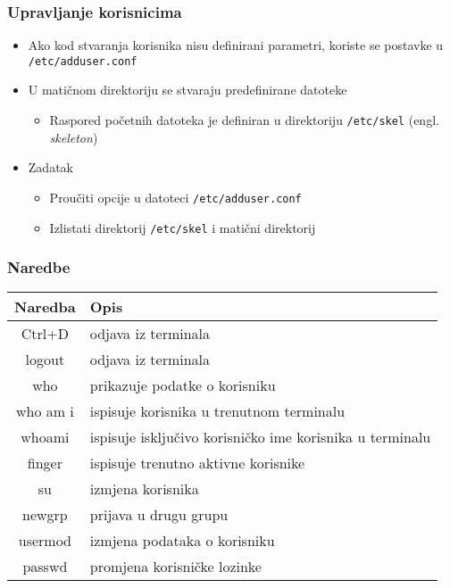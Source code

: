 \documentclass[table,usenames,dvipsnames] {beamer}
\newcommand{\shell}[1]{\texttt{#1}}
\begin{document}
\begin{frame}[t]
\frametitle{Upravljanje korisnicima}
\begin{itemize}
  \item Ako kod stvaranja korisnika nisu definirani parametri, koriste se 
        postavke u \shell{/etc/adduser.conf}
  \item U matičnom direktoriju se stvaraju predefinirane datoteke
  \begin{itemize}
     \item Raspored početnih datoteka je definiran u direktoriju \shell{/etc/skel} (engl. \emph{skeleton})
  \end{itemize}
\end{itemize}
\begin{itemize}
  \item Zadatak
  \begin{itemize}
    \item Proučiti opcije u datoteci \shell{/etc/adduser.conf}
    \item Izlistati direktorij \shell{/etc/skel} i matični direktorij
  \end{itemize}
\end{itemize}
\end{frame}

\begin{frame}[t]
	\frametitle{Naredbe}
	\begin{table}[h]
		\begin{tabular}{|c|l|}
			\hline
			\rowcolor{BlueViolet!20}Naredba & Opis \\
			\hline
			Ctrl+D & odjava iz terminala \\
			\hline
			logout & odjava iz terminala \\
			\hline
			who & prikazuje podatke o korisniku \\
			\hline
			who am i & ispisuje korisnika u trenutnom terminalu \\
			\hline
			whoami & ispisuje isključivo korisničko ime korisnika u terminalu \\
			\hline
			finger & ispisuje trenutno aktivne korisnike \\
			\hline
			su & izmjena korisnika \\
			\hline
			newgrp & prijava u drugu grupu \\
			\hline
			usermod & izmjena podataka o korisniku \\
			\hline
			passwd & promjena korisničke lozinke \\
			\hline
		\end{tabular}
	\end{table}
\end{frame}
\end{document}
